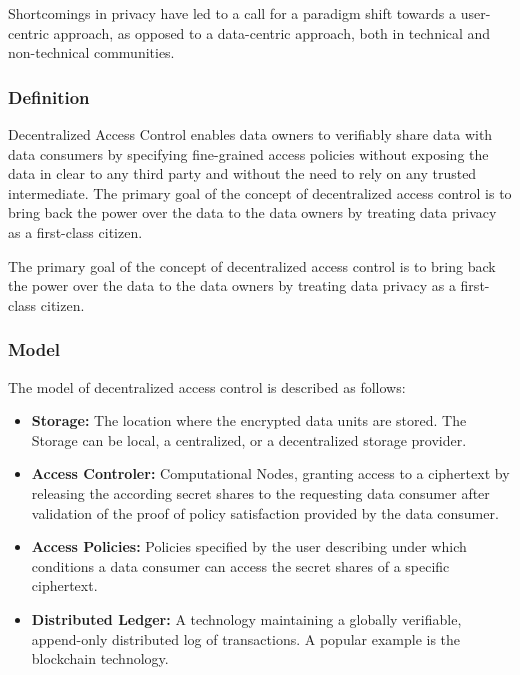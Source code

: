 \documentclass[conference]{IEEEtran}
\begin{document}
Shortcomings in privacy have led to a call for a paradigm shift towards a user-centric approach, as opposed to a data-centric approach, both in technical and non-technical communities. \cite{b3, b6}

\subsubsection{Definition}
Decentralized Access Control enables data owners to verifiably share data with data consumers by specifying fine-grained access policies without exposing the data in clear to any third party and without the need to rely on any trusted intermediate.
The primary goal of the concept of decentralized access control is to bring back the power over the data to the data owners by treating data privacy as a first-class citizen. \cite{b3}

The primary goal of the concept of decentralized access control is to bring back the power over the data to the data owners by treating data privacy as a first-class citizen.

\subsubsection{Model}

The model of decentralized access control is described as follows:

\begin{itemize}
  \item \textbf{Storage:} The location where the encrypted data units are stored.
  The Storage can be local, a centralized, or a decentralized storage provider.
  \item \textbf{Access Controler:} Computational Nodes, granting access to a ciphertext by releasing the according secret shares to the requesting data consumer after validation of the proof of policy satisfaction provided by the data consumer.
  \item \textbf{Access Policies:} Policies specified by the user describing under which conditions a data consumer can access the secret shares of a specific ciphertext.
  \item \textbf{Distributed Ledger:} A technology maintaining a globally verifiable, append-only distributed log of transactions. A popular example is the blockchain technology. 
\end{itemize}
\end{document}
